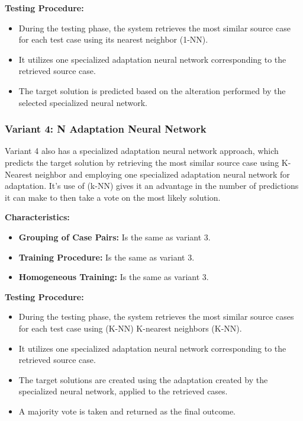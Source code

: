 \documentclass[a4paper, 12pt]{report}
\begin{document}
\textbf{Testing Procedure:}

\begin{itemize}
    \item During the testing phase, the system retrieves the most similar source case for each test case using its nearest neighbor (1-NN).
    \item It utilizes one specialized adaptation neural network corresponding to the retrieved source case.
    \item The target solution is predicted based on the alteration performed by the selected specialized neural network.
\end{itemize}

\subsubsection{Variant 4: N Adaptation Neural Network}

Variant 4 also has a specialized adaptation neural network approach,
which predicts the target solution by retrieving the most similar source case using K-Nearest neighbor and employing one specialized adaptation neural network for adaptation.
It's use of (k-NN) gives it an advantage in the number of predictions it can make to then take a vote on the most likely solution.

\textbf{Characteristics:}

\begin{itemize}
    \item \textbf{Grouping of Case Pairs:} Is the same as variant 3. 
    
    \item \textbf{Training Procedure:} Is the same as variant 3. 
    
    \item \textbf{Homogeneous Training:} Is the same as variant 3. 
\end{itemize}

\textbf{Testing Procedure:}

\begin{itemize}
    \item During the testing phase, the system retrieves the most similar source cases for each test case using (K-NN) K-nearest neighbors (K-NN).
    \item It utilizes one specialized adaptation neural network corresponding to the retrieved source case.
    \item The target solutions are created using the adaptation created by the specialized neural network, applied to the retrieved cases.
    \item A majority vote is taken and returned as the final outcome.
\end{itemize}
\end{document}
